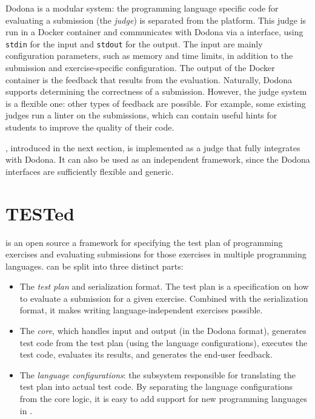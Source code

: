 \documentclass[5p,number]{elsarticle}
\begin{document}
    Dodona is a modular system: the programming language specific code for evaluating a submission (the \emph{judge}) is separated from the platform.
    This judge is run in a Docker container and communicates with Dodona via a  interface, using \texttt{stdin} for the input and \texttt{stdout} for the output.
    The input are mainly configuration parameters, such as memory and time limits, in addition to the submission and exercise-specific configuration.
    The output of the Docker container is the feedback that results from the evaluation.
    Naturally, Dodona supports determining the correctness of a submission.
    However, the judge system is a flexible one: other types of feedback are possible.
    For example, some existing judges run a linter on the submissions, which can contain useful hints for students to improve the quality of their code.
    
    \tested{}, introduced in the next section, is implemented as a judge that fully integrates with Dodona.
    It can also be used as an independent framework, since the Dodona  interfaces are sufficiently flexible and generic.

    \section{TESTed}\label{sec:extended-test}

    \tested{} is an open source a framework for specifying the test plan of programming exercises and evaluating submissions for those exercises in multiple programming languages.
    \tested{} can be split into three distinct parts:

    \begin{itemize}
        \item The \emph{test plan} and serialization format.
        The test plan is a specification on how to evaluate a submission for a given exercise.
        Combined with the serialization format, it makes writing language-independent exercises possible.
        \item The \emph{core}, which handles input and output (in the Dodona  format), generates test code from the test plan (using the language configurations), executes the test code, evaluates its results, and generates the end-user feedback.
        \item The \emph{language configurations}: the subsystem responsible for translating the test plan into actual test code.
        By separating the language configurations from the core logic, it is easy to add support for new programming languages in \tested{}.
    \end{itemize}
\end{document}
